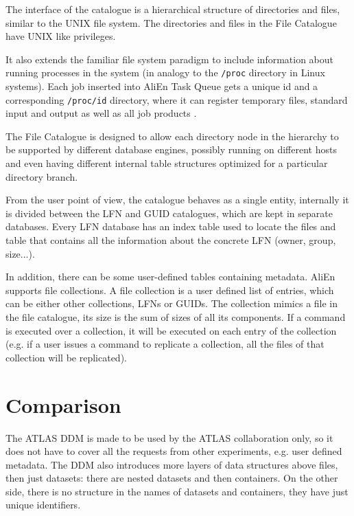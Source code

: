 The interface of the catalogue is a hierarchical structure of directories and
files, similar to the UNIX file system. The directories and files in the File
Catalogue have UNIX like privileges.

It also extends the familiar file system paradigm to include information about
running processes in the system (in analogy to the \texttt{/proc} directory in Linux
systems). Each job inserted into AliEn Task Queue gets a unique id and a
corresponding \texttt{/proc/id} directory, where it can register temporary files,
standard input and output as well as all job products \cite{AliEn1}.

The File Catalogue is designed to allow each directory node in the hierarchy to
be supported by different database engines, possibly running on different hosts
and even having different internal table structures optimized for a particular
directory branch. 

From the user point of view, the catalogue behaves as a single entity, internally
it is divided between the LFN and GUID catalogues, which are kept in separate
databases. Every LFN database has an index table used to locate the files and
table that contains all the information about the concrete LFN (owner, group,
size...).

In addition, there can be some user-defined tables containing metadata.
AliEn supports file collections.  A file collection is a user defined list of
entries, which can be either other collections, LFNs or GUIDs. The collection
mimics a file in the file catalogue, its size is the sum of sizes of
all its components. If a command is executed over a collection, it will be
executed on each entry of the collection (e.g. if a user issues a command to
replicate a collection, all the files of that collection will be replicated).

\section{Comparison}

The ATLAS DDM is made to be used by the ATLAS collaboration only, so it does not have to cover all the 
requests from other experiments, e.g. user defined metadata. The DDM also introduces more layers of data structures 
above files, then just datasets: there are nested datasets and then containers. On the other side, there is no
structure in the names of datasets and containers, they have just unique identifiers. 


